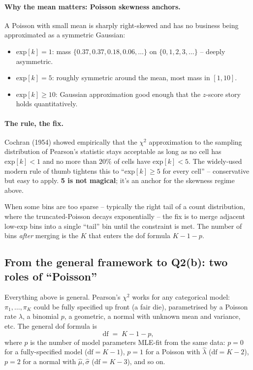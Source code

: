 \documentclass[11pt]{article}
\newcommand{\expc}{\mathrm{exp}}
\begin{document}
\paragraph{Why the mean matters: Poisson skewness anchors.}
A Poisson with small mean is sharply right-skewed and has no business being
approximated as a symmetric Gaussian:
\begin{itemize}[leftmargin=2em,itemsep=2pt]
\item $\expc[k] = 1$: mass $\{0.37, 0.37, 0.18, 0.06, \ldots\}$ on
       $\{0, 1, 2, 3, \ldots\}$ -- deeply asymmetric.
\item $\expc[k] = 5$: roughly symmetric around the mean, most mass in $[1, 10]$.
\item $\expc[k] \geq 10$: Gaussian approximation good enough that the
       $z$-score story holds quantitatively.
\end{itemize}

\paragraph{The rule, the fix.}
Cochran (1954) showed empirically that the $\chi^{2}$ approximation to the
sampling distribution of Pearson's statistic stays acceptable as long as no
cell has $\expc[k] < 1$ and no more than $20\%$ of cells have $\expc[k] < 5$.
The widely-used modern rule of thumb tightens this to
``$\expc[k] \geq 5$ for every cell'' -- conservative but easy to apply.
\textbf{5 is not magical}; it's an anchor for the skewness regime above.

When some bins are too sparse -- typically the right tail of a count
distribution, where the truncated-Poisson decays exponentially -- the fix is
to merge adjacent low-$\expc$ bins into a single ``tail'' bin until the
constraint is met. The number of bins \emph{after} merging is the $K$ that
enters the dof formula $K - 1 - p$.

\subsection{From the general framework to Q2(b): two roles of ``Poisson''}

Everything above is general. Pearson's $\chi^{2}$ works for any categorical
model: $\pi_1, \dots, \pi_K$ could be fully specified up front (a fair die),
parametrised by a Poisson rate $\lambda$, a binomial $p$, a geometric, a
normal with unknown mean and variance, etc. The general dof formula is
\[
   \mathrm{df} \;=\; K - 1 - p,
\]
where $p$ is the number of model parameters MLE-fit from the same data:
$p = 0$ for a fully-specified model ($\mathrm{df} = K-1$), $p = 1$ for a
Poisson with $\hat\lambda$ ($\mathrm{df} = K-2$), $p = 2$ for a normal with
$\hat\mu, \hat\sigma$ ($\mathrm{df} = K-3$), and so on.
\end{document}
